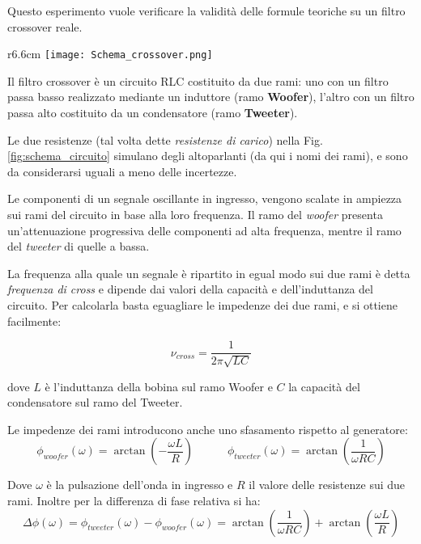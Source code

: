 \documentclass[../Relazione_circuiti]{subfiles}
\begin{document}
Questo esperimento vuole verificare la validità delle formule teoriche su un filtro crossover reale.

\begin{wrapfigure}{r}{6.6cm}
  \centering
  \texttt{[image: Schema\_crossover.png]}
  \caption{Schema del circuito realizzato}
  \label{fig:schema_circuito}
\end{wrapfigure}

Il filtro crossover è un circuito RLC costituito da due rami: uno con un filtro passa basso realizzato mediante un
induttore (ramo \textbf{Woofer}), l'altro con un filtro passa alto costituito da un condensatore (ramo
\textbf{Tweeter}).

Le due resistenze (tal volta dette \textit{resistenze di carico}) nella Fig.\,\ref{fig:schema_circuito} simulano degli
altoparlanti (da qui i nomi dei rami), e sono da considerarsi uguali a meno delle incertezze.

Le componenti di un segnale oscillante in ingresso, vengono scalate in ampiezza sui rami del circuito in base alla loro
frequenza.
Il ramo del \textit{woofer} presenta un'attenuazione progressiva delle componenti ad alta frequenza, mentre il ramo
del \textit{tweeter} di quelle a bassa.

La frequenza alla quale un segnale è ripartito in egual modo sui due rami è detta \textit{frequenza di cross} e dipende
dai valori della capacità e dell'induttanza del circuito.
Per calcolarla basta eguagliare le impedenze dei due rami, e si ottiene facilmente:

\begin{equation}
  \label{eq:f_cross}
  \nu_{cross} = \frac{1}{2 \pi \sqrt{LC} }
\end{equation}

dove $L$ è l'induttanza della bobina sul ramo Woofer e $C$ la capacità del condensatore sul ramo del Tweeter.

Le impedenze dei rami introducono anche uno sfasamento rispetto al generatore:
\begin{equation*}
  \phi_{woofer}(\omega) = \arctan(-\frac{\omega L}{R}) \qquad \quad %
  \phi_{tweeter}(\omega) = \arctan(\frac{1}{\omega RC}) %
\end{equation*}

Dove $\omega$ è la pulsazione dell'onda in ingresso e $R$ il valore delle resistenze sui due rami.
Inoltre per la differenza di fase relativa si ha:
\begin{equation}
  \label{eq:p_diff}
  \Delta \phi(\omega) = \phi_{tweeter}(\omega) - \phi_{woofer}(\omega) = \arctan(\frac{1}{\omega RC}) + \arctan(\frac{\omega L}{R})
\end{equation}
\end{document}
